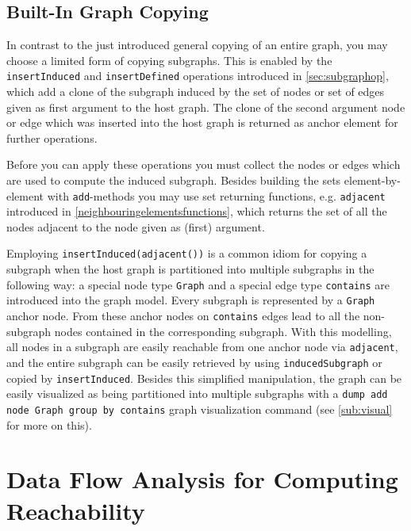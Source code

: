 \subsection{Built-In Graph Copying}\label{builtingraphcopying}
In contrast to the just introduced general copying of an entire graph, you may choose a limited form of copying subgraphs.
This is enabled by the \texttt{insertInduced} and \texttt{insertDefined} operations introduced in \ref{sec:subgraphop}, which add a clone of the subgraph induced by the set of nodes or set of edges given as first argument to the host graph.
The clone of the second argument node or edge which was inserted into the host graph is returned as anchor element for further operations.

Before you can apply these operations you must collect the nodes or edges which are used to compute the induced subgraph.
Besides building the sets element-by-element with \texttt{add}-methods you may use set returning functions, e.g. \texttt{adjacent} introduced in \ref{neighbouringelementsfunctions}, which returns the set of all the nodes adjacent to the node given as (first) argument.

Employing \texttt{insertInduced(adjacent())} is a common idiom for copying a subgraph when the host graph is partitioned into multiple subgraphs in the following way:
a special node type \texttt{Graph} and a special edge type \texttt{contains} are introduced into the graph model. 
Every subgraph is represented by a \texttt{Graph} anchor node.
From these anchor nodes on \texttt{contains} edges lead to all the non-subgraph nodes contained in the corresponding subgraph.
With this modelling, all nodes in a subgraph are easily reachable from one anchor node via \texttt{adjacent}, and the entire subgraph can be easily retrieved by using \texttt{inducedSubgraph} or copied by \texttt{insertInduced}.
Besides this simplified manipulation, the graph can be easily visualized as being partitioned into multiple subgraphs with a \texttt{dump add node Graph group by contains} graph visualization command (see \ref{sub:visual} for more on this).


\section{Data Flow Analysis for Computing Reachability}\label{subsub:flow}

